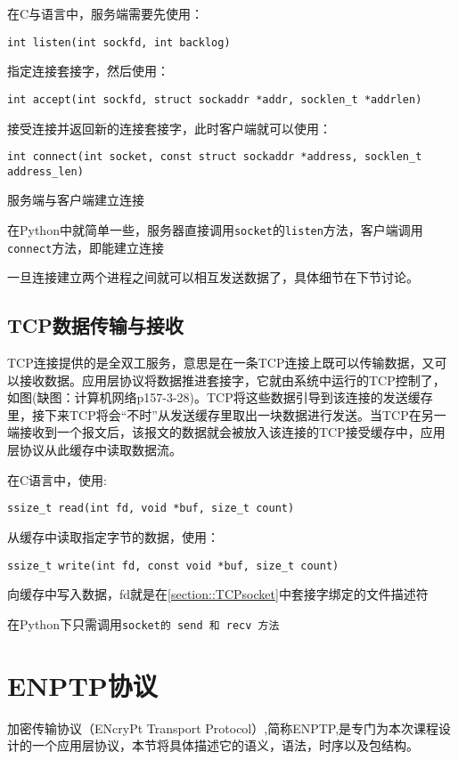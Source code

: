 \noindent 在C与语言中，服务端需要先使用：
\begin{verbatim}int listen(int sockfd, int backlog)\end{verbatim}
指定连接套接字，然后使用：
\begin{verbatim}int accept(int sockfd, struct sockaddr *addr, socklen_t *addrlen)\end{verbatim}
接受连接并返回新的连接套接字，此时客户端就可以使用：
\begin{verbatim}int connect(int socket, const struct sockaddr *address, socklen_t
address_len)\end{verbatim}
服务端与客户端建立连接

\noindent 在Python中就简单一些，服务器直接调用\verb|socket|的\verb|listen|方法，客户端调用\verb|connect|方法，即能建立连接

一旦连接建立两个进程之间就可以相互发送数据了，具体细节在下节讨论。

\subsection{TCP数据传输与接收}
\label{section::TCPtransport}
TCP连接提供的是全双工服务，意思是在一条TCP连接上既可以传输数据，又可以接收数据。应用层协议将数据推进套接字，它就由系统中运行的TCP控制了，如图(缺图：计算机网络p157-3-28)。TCP将这些数据引导到该连接的发送缓存里，接下来TCP将会“不时”从发送缓存里取出一块数据进行发送。当TCP在另一端接收到一个报文后，该报文的数据就会被放入该连接的TCP接受缓存中，应用层协议从此缓存中读取数据流。

\noindent 在C语言中，使用:
\begin{verbatim}ssize_t read(int fd, void *buf, size_t count)\end{verbatim}
从缓存中读取指定字节的数据，使用：
\begin{verbatim}ssize_t write(int fd, const void *buf, size_t count)\end{verbatim}
向缓存中写入数据，fd就是在\ref{section::TCPsocket}中套接字绑定的文件描述符

\noindent 在Python下只需调用\verb|socket的 send 和 recv 方法|

\section{ENPTP协议}
\label{section::ENPTP}
加密传输协议（ENcryPt Transport Protocol）,简称ENPTP,是专门为本次课程设计的一个应用层协议，本节将具体描述它的语义，语法，时序以及包结构。

